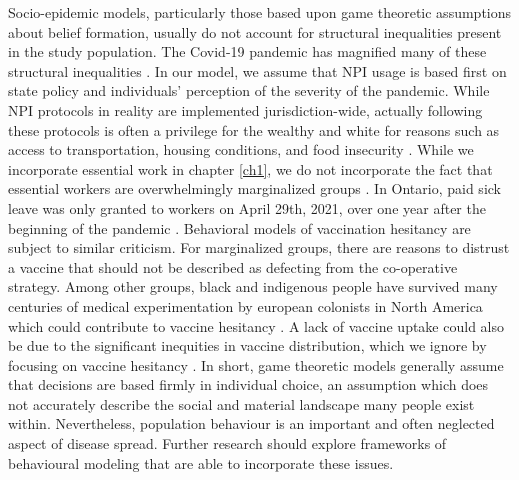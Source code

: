 Socio-epidemic models, particularly those based upon game theoretic assumptions about belief formation, usually do not account for structural inequalities present in the study population. The Covid-19 pandemic has magnified many of these structural inequalities \cite{yaya2020ethnic,chen2021revealing,chen2020covid,bowleg2020we,tuyisenge2021covid}. In our model, we assume that NPI usage is based first on state policy and individuals' perception of the severity of the pandemic. While NPI protocols in reality are implemented jurisdiction-wide, actually following these protocols is often a privilege for the wealthy and white for reasons such as access to transportation, housing conditions, and food insecurity \cite{jay2020neighbourhood,mamelund2021social}. While we incorporate essential work in chapter \ref{ch1}, we do not incorporate the fact that essential workers are overwhelmingly marginalized groups \cite{lancet2020plight}. In Ontario, paid sick leave was only granted to workers on April 29th, 2021, over one year after the beginning of the pandemic \cite{ontariosickleave}. Behavioral models of vaccination hesitancy are subject to similar criticism. For marginalized groups, there are reasons to distrust a vaccine that should not be described as defecting from the co-operative strategy. Among other groups, black and indigenous people have survived many centuries of medical experimentation by european colonists in North America \cite{pacheco2013moving,washington2006medical} which could contribute to vaccine hesitancy \cite{jamison2019you,bogart2021covid}. A lack of vaccine uptake could also be due to the significant inequities in vaccine distribution, which we ignore by focusing on vaccine hesitancy \cite{iveniuk2021uneven,osama2021covid,corbie2021vaccine}. In short, game theoretic models generally assume that decisions are based firmly in individual choice, an assumption which does not accurately describe the social and material landscape many people exist within. Nevertheless, population behaviour is an important and often neglected aspect of disease spread. Further research should explore frameworks of behavioural modeling that are able to incorporate these issues. 

